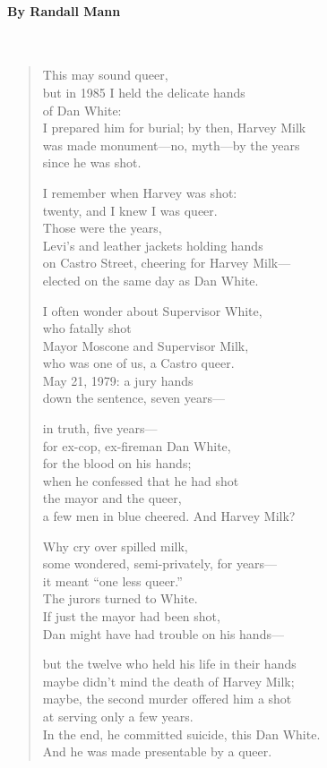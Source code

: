 \documentclass[10pt, letterpaper]{memoir}
\begin{document}
\paragraph{By Randall Mann}~
\begin{verse}
	This may sound queer,\\
	but in 1985 I held the delicate hands\\
	of Dan White:\\
	I prepared him for burial; by then, Harvey Milk\\
	was made monument—no, myth—by the years\\
	since he was shot.

	I remember when Harvey was shot:\\
	twenty, and I knew I was queer.\\
	Those were the years,\\
	Levi’s and leather jackets holding hands\\
	on Castro Street, cheering for Harvey Milk—\\
	elected on the same day as Dan White.

	I often wonder about Supervisor White,\\
	who fatally shot\\
	Mayor Moscone and Supervisor Milk,\\
	who was one of us, a Castro queer.\\
	May 21, 1979: a jury hands\\
	down the sentence, seven years—

	in truth, five years—\\
	for ex-cop, ex-fireman Dan White,\\
	for the blood on his hands;\\
	when he confessed that he had shot\\
	the mayor and the queer,\\
	a few men in blue cheered. And Harvey Milk?

	Why cry over spilled milk,\\
	some wondered, semi-privately, for years—\\
	it meant “one less queer.”\\
	The jurors turned to White.\\
	If just the mayor had been shot,\\
	Dan might have had trouble on his hands—

	but the twelve who held his life in their hands\\
	maybe didn’t mind the death of Harvey Milk;\\
	maybe, the second murder offered him a shot\\
	at serving only a few years.\\
	In the end, he committed suicide, this Dan White.\\
	And he was made presentable by a queer.
\end{verse}
\end{document}
